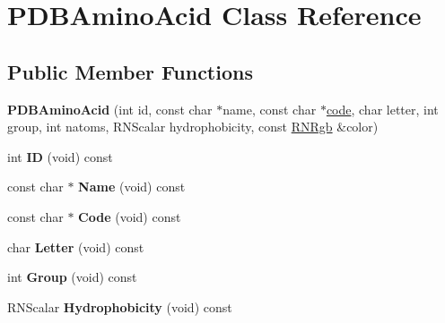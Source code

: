 \hypertarget{class_p_d_b_amino_acid}{}\section{P\+D\+B\+Amino\+Acid Class Reference}
\label{class_p_d_b_amino_acid}
\subsection*{Public Member Functions}
\begin{DoxyCompactItemize}
\item 
{\bfseries P\+D\+B\+Amino\+Acid} (int id, const char $\ast$name, const char $\ast$\hyperlink{structcode}{code}, char letter, int group, int natoms, R\+N\+Scalar hydrophobicity, const \hyperlink{class_r_n_rgb}{R\+N\+Rgb} \&color)\hypertarget{class_p_d_b_amino_acid_a790bb6eeb3aa69a4afe5e7d0808a2533}{}\label{class_p_d_b_amino_acid_a790bb6eeb3aa69a4afe5e7d0808a2533}

\item 
int {\bfseries ID} (void) const \hypertarget{class_p_d_b_amino_acid_a72e2f39846ea1c3cee32fc0edb51555c}{}\label{class_p_d_b_amino_acid_a72e2f39846ea1c3cee32fc0edb51555c}

\item 
const char $\ast$ {\bfseries Name} (void) const \hypertarget{class_p_d_b_amino_acid_a60bbccaf9cae46615bd20ccf07eab145}{}\label{class_p_d_b_amino_acid_a60bbccaf9cae46615bd20ccf07eab145}

\item 
const char $\ast$ {\bfseries Code} (void) const \hypertarget{class_p_d_b_amino_acid_afd6a5f72db2322360914865614207394}{}\label{class_p_d_b_amino_acid_afd6a5f72db2322360914865614207394}

\item 
char {\bfseries Letter} (void) const \hypertarget{class_p_d_b_amino_acid_ab13da24e64b6f937cf605e41ec1e1278}{}\label{class_p_d_b_amino_acid_ab13da24e64b6f937cf605e41ec1e1278}

\item 
int {\bfseries Group} (void) const \hypertarget{class_p_d_b_amino_acid_ae5b4f1282088d0de9fd858e2c1b23262}{}\label{class_p_d_b_amino_acid_ae5b4f1282088d0de9fd858e2c1b23262}

\item 
R\+N\+Scalar {\bfseries Hydrophobicity} (void) const \hypertarget{class_p_d_b_amino_acid_aa571a03e5ea03b59d49e43f2c8c1e48c}{}\label{class_p_d_b_amino_acid_aa571a03e5ea03b59d49e43f2c8c1e48c}


\end{DoxyCompactItemize}
